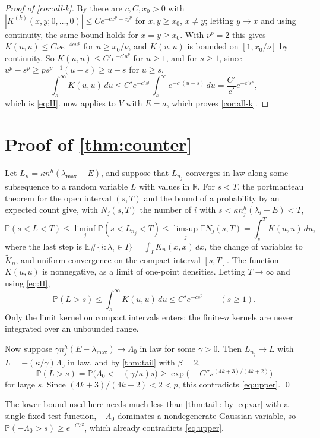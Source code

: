 \documentclass[11pt]{article}
\theoremstyle{remark}
\newcommand{\E}{\mathbb{E}}
\newcommand{\Prob}{\mathbb{P}}
\newcommand{\R}{\mathbb{R}}
\begin{document}
\begin{proof}[Proof of \cref{cor:all-k}]
By \cite[(1.23)]{CIK} there are $c,C,x_0>0$ with $|K^{(k)}(x,y;0,\dots,0)|\le Ce^{-cx^{p}-cy^{p}}$ for $x,y\ge x_0$,
$x\ne y$; letting $y\to x$ and using continuity, the same bound holds for $x=y\ge x_0$. With $\nu^p=2$ this gives
$K(u,u)\le C\nu e^{-4cu^{p}}$ for $u\ge x_0/\nu$, and $K(u,u)$ is bounded on $[1,x_0/\nu]$ by continuity. So
$K(u,u)\le C'e^{-c'u^{p}}$ for $u\ge1$, and for $s\ge1$, since $u^p-s^p\ge ps^{p-1}(u-s)\ge u-s$ for $u\ge s$,
\[
\int_s^\infty K(u,u)\,du\le C'e^{-c's^{p}}\int_s^\infty e^{-c'(u-s)}\,du=\frac{C'}{c'}e^{-c's^{p}},
\]
which is \eqref{eq:H}.  now applies to $V$ with $E=a$, which proves \cref{cor:all-k}.
\end{proof}

\section{Proof of \texorpdfstring{\cref{thm:counter}}{Theorem 1.2}}

Let $L_n=\kappa n^{h}(\lambda_{\max}-E)$, and suppose that $L_{n_j}$ converges in law along some subsequence to a
random variable $L$ with values in $\R$. For $s<T$, the portmanteau theorem for the open interval $(s,T)$ and the
bound of a probability by an expected count give, with $N_j(s,T)$ the number of $i$ with
$s<\kappa n_j^h(\lambda_i-E)<T$,
\[
\Prob(s<L<T)\le\liminf_j\Prob(s<L_{n_j}<T)\le\limsup_j\E N_j(s,T)=\int_s^TK(u,u)\,du,
\]
where the last step is $\E\#\{i:\lambda_i\in I\}=\int_IK_n(x,x)\,dx$, the change of variables to $\widetilde K_n$, and uniform
convergence on the compact interval $[s,T]$. The function $K(u,u)$ is nonnegative, as a limit of one-point densities.
Letting $T\to\infty$ and using \eqref{eq:H},
\begin{equation}\label{eq:upper}
\Prob(L>s)\le\int_s^\infty K(u,u)\,du\le C'e^{-c s^{p}}\qquad(s\ge1).
\end{equation}
Only the limit kernel on compact intervals enters; the finite-$n$ kernels are never integrated over an unbounded
range.

Now suppose $\gamma n_j^h(E-\lambda_{\max})\to\Lambda_0$ in law for some $\gamma>0$. Then $L_{n_j}\to L$ with
$L=-(\kappa/\gamma)\Lambda_0$ in law, and by \cref{thm:tail} with $\beta=2$,
\[
\Prob(L>s)=\Prob\bigl(\Lambda_0<-(\gamma/\kappa)s\bigr)\ge\exp\bigl(-C''s^{(4k+3)/(4k+2)}\bigr)
\]
for large $s$. Since $(4k+3)/(4k+2)<2<p$, this contradicts \eqref{eq:upper}. \qed

\medskip
The lower bound used here needs much less than \cref{thm:tail}: by \eqref{eq:var} with a single fixed test function,
$-\Lambda_0$ dominates a nondegenerate Gaussian variable, so $\Prob(-\Lambda_0>s)\ge e^{-Cs^2}$, which already
contradicts \eqref{eq:upper}.
\end{document}
